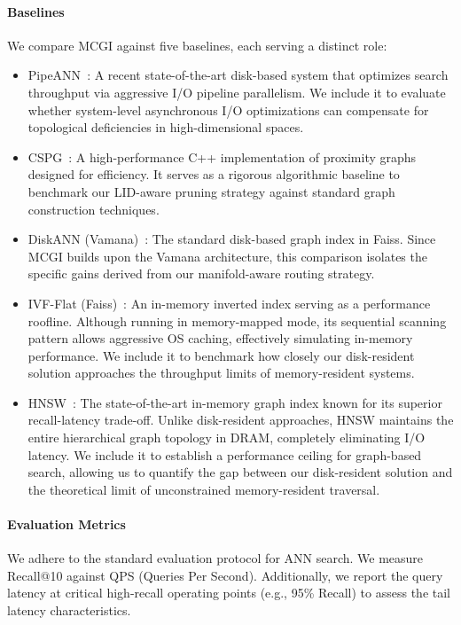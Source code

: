 \documentclass{article}
\theoremstyle{plain}
\theoremstyle{definition}
\theoremstyle{remark}
\begin{document}
\paragraph{Baselines} 
We compare MCGI against five baselines, each serving a distinct role:
\begin{itemize}
    \item PipeANN~\cite{osdi25pipeann, fast26odinann}: A recent state-of-the-art disk-based system that optimizes search throughput via aggressive I/O pipeline parallelism. We include it to evaluate whether system-level asynchronous I/O optimizations can compensate for topological deficiencies in high-dimensional spaces.
    \item CSPG~\cite{NEURIPS2024_bab1486c}: A high-performance C++ implementation of proximity graphs designed for efficiency. It serves as a rigorous algorithmic baseline to benchmark our LID-aware pruning strategy against standard graph construction techniques.
    \item DiskANN (Vamana)~\cite{subramanya2019diskann}: The standard disk-based graph index in Faiss. Since MCGI builds upon the Vamana architecture, this comparison isolates the specific gains derived from our manifold-aware routing strategy.
    \item IVF-Flat (Faiss)~\cite{johnson2019billion}: An in-memory inverted index serving as a performance roofline. Although running in memory-mapped mode, its sequential scanning pattern allows aggressive OS caching, effectively simulating in-memory performance. We include it to benchmark how closely our disk-resident solution approaches the throughput limits of memory-resident systems.
    \item HNSW~\cite{malkov2018efficient}: The state-of-the-art in-memory graph index known for its superior recall-latency trade-off. Unlike disk-resident approaches, HNSW maintains the entire hierarchical graph topology in DRAM, completely eliminating I/O latency. We include it to establish a performance ceiling for graph-based search, allowing us to quantify the gap between our disk-resident solution and the theoretical limit of unconstrained memory-resident traversal. 
\end{itemize}

\paragraph{Evaluation Metrics} 
We adhere to the standard evaluation protocol for ANN search. We measure Recall@10 against QPS (Queries Per Second). Additionally, we report the query latency at critical high-recall operating points (e.g., 95\% Recall) to assess the tail latency characteristics.
\end{document}
